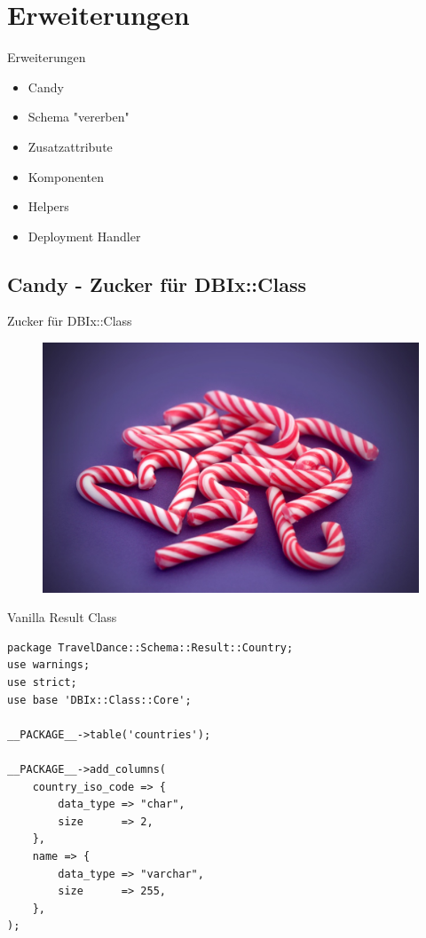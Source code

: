 \section{Erweiterungen}

\begin{frame}{Erweiterungen}
\begin{itemize}
\item Candy
\item Schema "vererben"
\item Zusatzattribute
\item Komponenten
\item Helpers
\item Deployment Handler
\end{itemize}
\end{frame}

\subsection{Candy - Zucker für DBIx::Class}

\begin{frame}{Zucker für DBIx::Class}
\begin{figure}[!ht]
\centering
\includegraphics[width=0.8\linewidth]{img/candy-cane.jpg}
\end{figure}
\end{frame}

\begin{frame}[fragile]{Vanilla Result Class}
\begin{lstlisting}
package TravelDance::Schema::Result::Country;
use warnings;
use strict;
use base 'DBIx::Class::Core';

__PACKAGE__->table('countries');

__PACKAGE__->add_columns(
    country_iso_code => {
        data_type => "char",
        size      => 2,
    },
    name => {
        data_type => "varchar",
        size      => 255,
    },
);
\end{lstlisting}
\end{frame}

